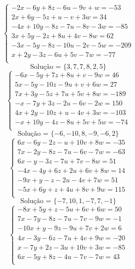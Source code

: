 \documentclass[12pt,oneside,a4paper]{article}
\begin{document}
\vspace{\baselineskip}
\begin{equation*}
\begin{cases}
-2x-6y+8z-6u-9v+w=-53 \\
2x+6y-5z+u-v+3w=34 \\
-4x+10y-8z-7u-8v-3w=-85 \\
3x+5y-2z+8u+4v-8w=62 \\
-3x-5y-8z-10u-2v-5w=-209 \\
x+2y-3z-6u+5v-7w=-77 \\
\end{cases}
\end{equation*}
\begin{equation*}
\text{Solução = }\{3,7,7,8,2,5\}
\end{equation*}
\vspace{\baselineskip}
\begin{equation*}
\begin{cases}
-6x-5y+7z+8u+v-9w=46 \\
5x-5y-10z-9u+v+6w=27 \\
7x+3y-5z+7u+5v+8w=-189 \\
-x-7y+3z-2u-6v-2w=150 \\
4x+2y-10z+u-4v+3w=-103 \\
-x+10y-4z-8u+5v+5w=-74 \\
\end{cases}
\end{equation*}
\begin{equation*}
\text{Solução = }\{-6,-10,8,-9,-6,2\}
\end{equation*}
\vspace{\baselineskip}
\begin{equation*}
\begin{cases}
6x-6y-2z-u+10v+8w=-35 \\
7x-2y-8z-7u-6v-7w=-63 \\
6x-y-3z-7u+7v-8w=51 \\
-4x-4y+6z+2u+6v+8w=14 \\
-9x+y-z-2u-4v+7w=51 \\
-5x+6y+z+4u+8v+9w=115 \\
\end{cases}
\end{equation*}
\begin{equation*}
\text{Solução = }\{-7,10,1,-7,7,-1\}
\end{equation*}
\vspace{\baselineskip}
\begin{equation*}
\begin{cases}
-8x+5y+z-5u+6v+6w=50 \\
7x-7y-8z-7u-7v-9w=-1 \\
-10x+y-9z-9u+7v+2w=6 \\
4x-3y-6z-7u+4v+9w=-20 \\
x-7y+2z-3u+10v+3w=-85 \\
6x-5y+8z-4u-7v-7w=43 \\
\end{cases}
\end{equation*}
\end{document}
